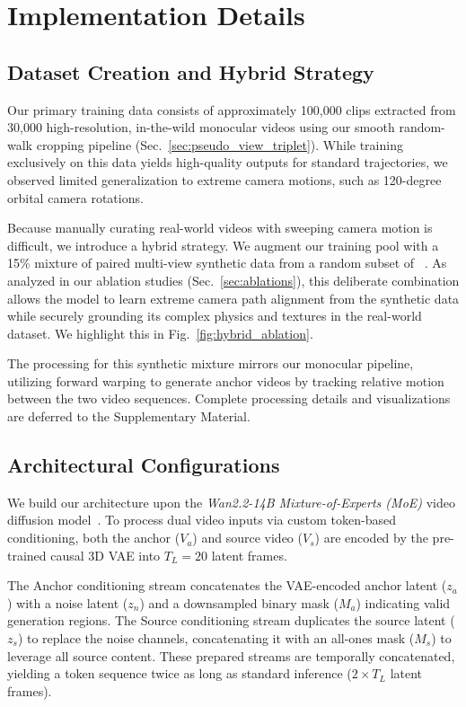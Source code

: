 
\section{Implementation Details}
\label{sec:implementation}


\subsection{Dataset Creation and Hybrid Strategy}
\label{sec:dataset_creation}

Our primary training data consists of approximately 100,000 clips extracted from 30,000 high-resolution, in-the-wild monocular videos using our smooth random-walk cropping pipeline (Sec.~\ref{sec:pseudo_view_triplet}). While training exclusively on this data yields high-quality outputs for standard trajectories, we observed limited generalization to extreme camera motions, such as 120-degree orbital camera rotations.

Because manually curating real-world videos with sweeping camera motion is difficult, we introduce a hybrid strategy. We augment our training pool with a 15\% mixture of paired multi-view synthetic data from a random subset of \recammaster{}~\cite{bai2025recammaster}. As analyzed in our ablation studies (Sec.~\ref{sec:ablations}), this deliberate combination allows the model to learn extreme camera path alignment from the synthetic data while securely grounding its complex physics and textures in the real-world dataset. We highlight this in Fig.~\ref{fig:hybrid_ablation}.

The processing for this synthetic mixture mirrors our monocular pipeline, utilizing forward warping to generate anchor videos by tracking relative motion between the two video sequences. Complete processing details and visualizations are deferred to the Supplementary Material.

\subsection{Architectural Configurations}
\label{sec:arch_configs}

We build our architecture upon the \textit{Wan2.2-14B Mixture-of-Experts (MoE)} video diffusion model~\cite{wan21}. To process dual video inputs via custom token-based conditioning, both the anchor ($V_a$) and source video ($V_s$) are encoded by the pre-trained causal 3D VAE into $T_L = 20$ latent frames.

The Anchor conditioning stream concatenates the VAE-encoded anchor latent ($z_a$) with a noise latent ($z_n$) and a downsampled binary mask ($M_a$) indicating valid generation regions. The Source conditioning stream duplicates the source latent ($z_s$) to replace the noise channels, concatenating it with an all-ones mask ($M_s$) to leverage all source content. These prepared streams are temporally concatenated, yielding a token sequence twice as long as standard inference ($2 \times T_L$ latent frames).

